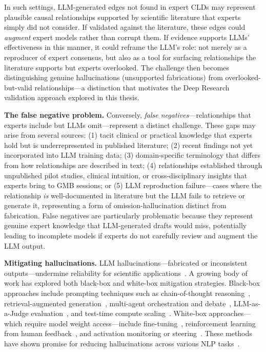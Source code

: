 In such settings, LLM-generated edges not found in expert CLDs may represent plausible causal relationships supported by scientific literature that experts simply did not consider. If validated against the literature, these edges could \emph{augment} expert models rather than corrupt them. If evidence supports LLMs' effectiveness in this manner, it could reframe the LLM's role: not merely as a reproducer of expert consensus, but also as a tool for surfacing relationships the literature supports but experts overlooked. The challenge then becomes distinguishing genuine hallucinations (unsupported fabrications) from overlooked-but-valid relationships---a distinction that motivates the Deep Research validation approach explored in this thesis.

\medskip
\noindent
\textbf{The false negative problem.} Conversely, \emph{false negatives}---relationships that experts include but LLMs omit---represent a distinct challenge. These gaps may arise from several sources: (1) tacit clinical or practical knowledge that experts hold but is underrepresented in published literature; (2) recent findings not yet incorporated into LLM training data; (3) domain-specific terminology that differs from how relationships are described in text; (4) relationships established through unpublished pilot studies, clinical intuition, or cross-disciplinary insights that experts bring to GMB sessions; or (5) LLM reproduction failure---cases where the relationship \emph{is} well-documented in literature but the LLM fails to retrieve or generate it, representing a form of omission-hallucination distinct from fabrication. False negatives are particularly problematic because they represent genuine expert knowledge that LLM-generated drafts would miss, potentially leading to incomplete models if experts do not carefully review and augment the LLM output.

\medskip
\noindent
\textbf{Mitigating hallucinations.} LLM hallucinations---fabricated or inconsistent outputs---undermine reliability for scientific applications~\citep{varshney2023stitch}. A growing body of work has explored both black-box and white-box mitigation strategies. Black-box approaches include prompting techniques such as chain-of-thought reasoning~\citep{wei2022chain, brown2020language}, retrieval-augmented generation~\citep{lewis2020retrieval, zhang2024causal}, multi-agent orchestration and debate~\citep{shinn2024reflexion, lu2024ai}, LLM-as-a-Judge evaluation~\citep{zheng2024judging}, and test-time compute scaling~\citep{openai2024reasoning, shinn2024reflexion, guo2025deepseek}. White-box approaches---which require model weight access---include fine-tuning~\citep{hu2021lora}, reinforcement learning from human feedback~\citep{ouyang2022rlhf}, and activation monitoring or steering~\citep{wang2024adaptive}. These methods have shown promise for reducing hallucinations across various NLP tasks~\citep{tonmoy2024comprehensive}.

